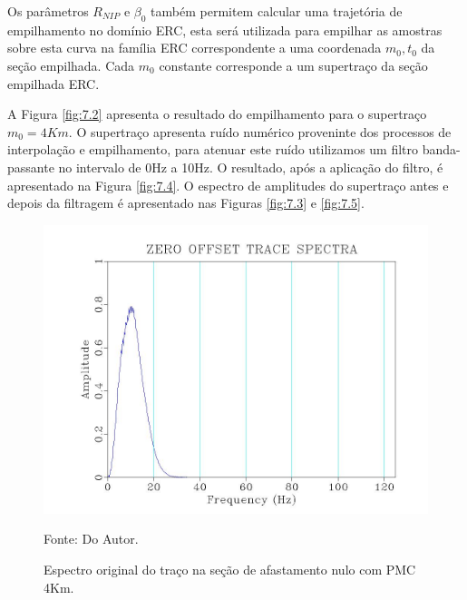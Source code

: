 Os parâmetros $R_{NIP}$ e $\beta_0$ também permitem calcular uma trajetória de empilhamento no domínio ERC, esta será utilizada
para empilhar as amostras sobre esta curva na família ERC correspondente a uma coordenada $m_0, t_0$ da seção empilhada.
Cada $m_0$ constante corresponde a um supertraço da seção empilhada ERC. 

A Figura \ref{fig:7.2} apresenta o resultado do empilhamento para o supertraço $m_0=4Km$. O supertraço apresenta ruído numérico
proveninte dos processos de interpolação e empilhamento, para atenuar este ruído utilizamos um filtro banda-passante no 
intervalo de 0Hz a 10Hz. O resultado, após a aplicação do filtro, é apresentado na Figura \ref{fig:7.4}. O espectro de amplitudes
do supertraço antes e depois da filtragem é apresentado nas Figuras \ref{fig:7.3} e \ref{fig:7.5}.

\begin{figure}
\caption{Espectro original do traço na seção de afastamento nulo com PMC 4Km.}
\begin{center}
\includegraphics[scale=0.4]{images/originalTraceSpectra.jpeg}
\vspace{-0.3cm}
\end{center}
\begin{center}
 Fonte: Do Autor.
\end{center}
\label{fig:7.1}
\end{figure}


